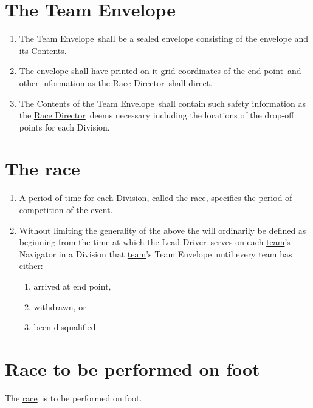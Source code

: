 \documentclass[12pt]{report}
\makeatletter
\newcommand{\nop}[1]{\Hy@raisedlink{\hypertarget{#1}{}}}
\newcommand{\hyplink}[1]{\hyperlink{#1}{{#1}}}
\newcommand{\defi}[1]{\nop{#1}{\textbf{\emph{#1}}}\index{#1}}
\newcommand\dropoffpoint{drop-off point}
\newcommand\Endpoint{end point}
\newcommand{\LeadDriver}{Lead Driver}
\newcommand{\race}{\hyplink{race}}
\newcommand{\RaceDirector}{\hyplink{Race Director}}
\newcommand{\team}{\hyplink{team}}
\newcommand{\TeamEnvelope}{Team Envelope}
\makeatother
\begin{document}
  \section{The \TeamEnvelope}
  \begin{enumerate}
    \item The \TeamEnvelope\ shall be a sealed envelope consisting of the envelope and its Contents.
    \item The envelope shall have printed on it grid coordinates of the \Endpoint\ and other information as the \RaceDirector\ shall direct.
    \item The Contents of the \TeamEnvelope\ shall contain such safety information as the \RaceDirector\ deems necessary including the locations of the \dropoffpoint s for each Division.
  \end{enumerate}
  \section{The race}
  \begin{enumerate}
    \item A period of time for each Division, called the \race, specifies the period of competition of the event.
    \item Without limiting the generality of the above the \defi{race} will ordinarily be defined as beginning from the time at which the \LeadDriver\ serves on each \team's Navigator in a Division that \team's \TeamEnvelope\ until every team has either:
        \begin{enumerate}
          \item arrived at \Endpoint,
          \item  withdrawn, or
          \item been disqualified.
        \end{enumerate}
  \end{enumerate}
  \section{Race to be performed on foot}
  \begin{fenumerate}
  \item The \race\ is to be performed on foot.
  \end{fenumerate}
\end{document}
